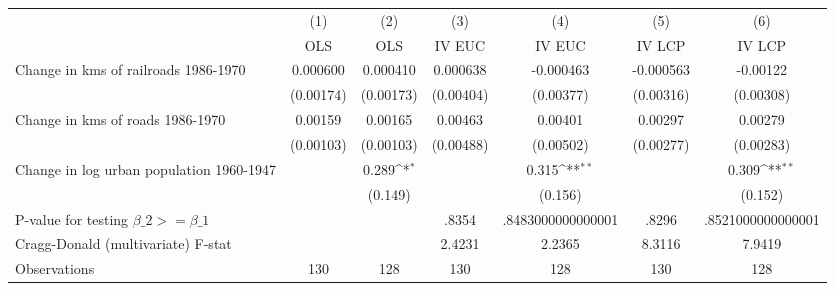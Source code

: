 {
\def\sym#1{\ifmmode^{#1}\else\(^{#1}\)\fi}
\begin{tabular}{l*{6}{c}}
\hline\hline
                &\multicolumn{1}{c}{(1)}&\multicolumn{1}{c}{(2)}&\multicolumn{1}{c}{(3)}&\multicolumn{1}{c}{(4)}&\multicolumn{1}{c}{(5)}&\multicolumn{1}{c}{(6)}\\
                &\multicolumn{1}{c}{OLS}&\multicolumn{1}{c}{OLS}&\multicolumn{1}{c}{IV EUC}&\multicolumn{1}{c}{IV EUC}&\multicolumn{1}{c}{IV LCP}&\multicolumn{1}{c}{IV LCP}\\
\hline
Change in kms of railroads 1986-1970& 0.000600         & 0.000410         & 0.000638         &-0.000463         &-0.000563         & -0.00122         \\
                &(0.00174)         &(0.00173)         &(0.00404)         &(0.00377)         &(0.00316)         &(0.00308)         \\
[1em]
Change in kms of roads 1986-1970&  0.00159         &  0.00165         &  0.00463         &  0.00401         &  0.00297         &  0.00279         \\
                &(0.00103)         &(0.00103)         &(0.00488)         &(0.00502)         &(0.00277)         &(0.00283)         \\
[1em]
Change in log urban population 1960-1947&                  &    0.289\sym{*}  &                  &    0.315\sym{**} &                  &    0.309\sym{**} \\
                &                  &  (0.149)         &                  &  (0.156)         &                  &  (0.152)         \\
\hline
P-value for testing $\beta\_{2} >= \beta\_{1}$&                  &                  &    .8354         &.8483000000000001         &    .8296         &.8521000000000001         \\
Cragg-Donald (multivariate) F-stat&                  &                  &   2.4231         &   2.2365         &   8.3116         &   7.9419         \\
Observations    &      130         &      128         &      130         &      128         &      130         &      128         \\
\hline\hline
\end{tabular}
}
